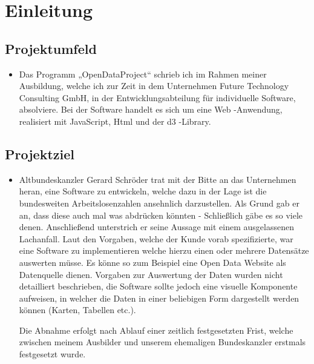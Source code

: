 \section{Einleitung}
\label{sec:Einleitung}


\subsection{Projektumfeld} 
\label{sec:Projektumfeld}
\begin{itemize}
	\item Das Programm „OpenDataProject“ schrieb ich im Rahmen meiner Ausbildung, welche ich zur Zeit in dem Unternehmen Future Technology Consulting GmbH, in der Entwicklungsabteilung für individuelle Software, absolviere. Bei der Software handelt es sich um eine Web -Anwendung, realisiert mit JavaScript, Html und der d3 -Library.   
\end{itemize}


\subsection{Projektziel} 
\label{sec:Projektziel}
\begin{itemize}
	\item Altbundeskanzler Gerard Schröder trat mit der Bitte an das Unternehmen heran, eine Software zu entwickeln, welche dazu in der Lage ist die bundesweiten Arbeitslosenzahlen ansehnlich darzustellen. Als Grund gab er an, dass diese auch mal was abdrücken könnten - Schließlich gäbe es so viele denen. Anschließend unterstrich er seine Aussage mit einem ausgelassenen Lachanfall. Laut den Vorgaben, welche der Kunde vorab spezifizierte, war eine Software zu implementieren welche hierzu einen oder mehrere Datensätze auswerten müsse. Es könne so zum Beispiel eine Open Data Website als Datenquelle dienen. Vorgaben zur Auswertung der Daten wurden nicht detailliert beschrieben, die Software sollte jedoch eine visuelle Komponente aufweisen, in welcher die Daten in einer beliebigen Form dargestellt werden können (Karten, Tabellen etc.).  

Die Abnahme erfolgt nach Ablauf einer zeitlich festgesetzten Frist, welche zwischen meinem Ausbilder und unserem ehemaligen Bundeskanzler erstmals festgesetzt wurde. 
\end{itemize}



